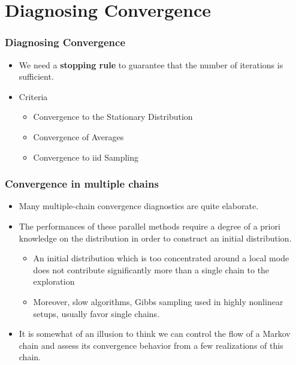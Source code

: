 \documentclass[10pt]{beamer}
\begin{document}
\section{Diagnosing Convergence}
\begin{frame}
  \frametitle{Diagnosing Convergence}

  \begin{itemize}
  \item We need a \textbf{stopping rule} to guarantee that the number of
    iterations is sufficient.

  \item Criteria

    \begin{itemize}
    \item Convergence to the Stationary Distribution
    \item Convergence of Averages
    \item Convergence to iid Sampling
    \end{itemize}
  \end{itemize}

\end{frame}


\begin{frame}
  \frametitle{Convergence in multiple chains}

  \begin{itemize}
  \item Many multiple-chain convergence diagnostics are quite elaborate.
  \item The performances of these parallel methods require a degree of a priori
    knowledge on the distribution in order to construct an initial
    distribution.


    \begin{itemize}
    \item An initial distribution which is too concentrated around a local mode
      does not contribute significantly more than a single chain to the
      exploration

    \item Moreover, slow algorithms, Gibbs sampling used in highly nonlinear
      setups, usually favor single chains.

    \end{itemize}


  \item It is somewhat of an illusion to think we can control the flow of a
    Markov chain and assess its convergence behavior from a few realizations of
    this chain.

  \end{itemize}
\end{frame}
\end{document}
